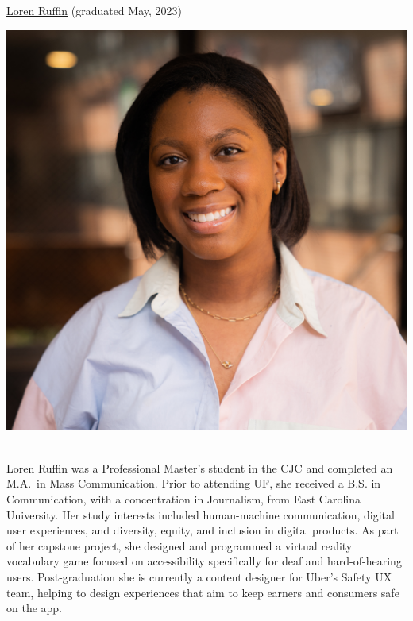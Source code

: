 \documentclass[]{article}
\begin{document}
\href{https://www.linkedin.com/in/loren-ruffin/}{Loren Ruffin}
(graduated May, 2023)

\includegraphics{images/LorenRuffin_CJCHeadshot.jpg} ~

Loren Ruffin was a Professional Master's student in the CJC and
completed an M.A.~in Mass Communication. Prior to attending UF, she
received a B.S. in Communication, with a concentration in Journalism,
from East Carolina University. Her study interests included
human-machine communication, digital user experiences, and diversity,
equity, and inclusion in digital products. As part of her capstone
project, she designed and programmed a virtual reality vocabulary game
focused on accessibility specifically for deaf and hard-of-hearing
users. Post-graduation she is currently a content designer for Uber's
Safety UX team, helping to design experiences that aim to keep earners
and consumers safe on the app.\\
\end{document}

